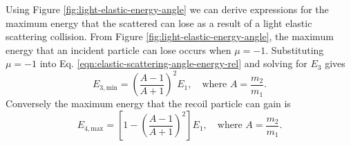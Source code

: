 Using Figure \ref{fig:light-elastic-energy-angle} we can derive expressions for the maximum energy that the scattered can lose as a result of a light elastic scattering collision. From Figure \ref{fig:light-elastic-energy-angle}, the maximum energy that an incident particle can lose occurs when $\mu = -1$. Substituting $\mu = -1$ into Eq. \eqref{eqn:elastic-scattering-angle-energy-rel} and solving for $E_3$ gives
\begin{equation}
  E_{3,\text{min}} = \left(\dfrac{A - 1}{A + 1}\right)^2 E_1, \quad \text{where} \,\, A = \dfrac{m_2}{m_1}.
\end{equation}
Conversely the maximum energy that the recoil particle can gain is 
\begin{equation}
  E_{4,\text{max}} = \left[1 - \left(\dfrac{A - 1}{A + 1}\right)^2\right] E_1, \quad \text{where} \,\, A = \dfrac{m_2}{m_1}.
\end{equation}

